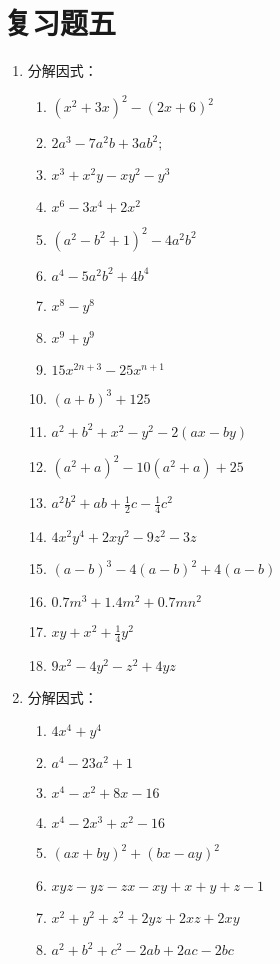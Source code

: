 \section*{复习题五}

\begin{enumerate}
\item 分解因式：
\begin{multicols}{2}
    \begin{enumerate}
    \item $\left(x^{2}+3 x\right)^{2}-(2 x+6)^{2}$
    \item $2 a^{3}-7 a^{2} b+3 a b^{2} ;$
    \item  $x^{3}+x^{2} y-x y^{2}-y^{3}$
    \item  $x^{6}-3 x^{4}+2 x^{2}$
    \item  $\left(a^{2}-b^{2}+1\right)^{2}-4 a^{2} b^{2}$
    \item  $a^{4}-5 a^{2} b^{2}+4 b^{4}$
    \item  $x^{8}-y^{8}$
    \item  $x^{9}+y^{9}$
    \item  $15 x^{2 n+3}-25 x^{n+1}$ 
    \item  $(a+b)^{3}+125$
    \item  $a^{2}+b^{2}+x^{2}-y^{2}-2(a x-b y)$
    \item  $\left(a^{2}+a\right)^{2}-10\left(a^{2}+a\right)+25$
    \item  $a^{2} b^{2}+a b+\frac{1}{2} c-\frac{1}{4} c^{2}$ 
    \item  $4 x^{2} y^{4}+2 x y^{2}-9 z^{2}-3 z$
    \item  $(a-b)^{3}-4(a-b)^{2}+4(a-b)$
    \item  $0.7 m^{3}+1.4 m^{2}+0.7 m n^{2}$ 
    \item  $x y+x^{2}+\frac{1}{4} y^{2}$
    \item  $9 x^{2}-4 y^{2}-z^{2}+4 y z$
\end{enumerate}
\end{multicols}

\item 分解因式：
\begin{multicols}{2}
\begin{enumerate}
    \item $4 x^{4}+y^{4} $
    \item $a^{4}-23 a^{2}+1$
    \item $x^{4}-x^{2}+8 x-16$
    \item $x^{4}-2 x^{3}+x^{2}-16$
    \item $(a x+b y)^{2}+(b x-a y)^{2}$
    \item   $x y z-y z-z x-x y+x+y+z-1$
    \item  $x^{2}+y^{2}+z^{2}+2 y z+2 x z+2 x y$
    \item  $a^{2}+b^{2}+c^{2}-2 a b+2 a c-2 b c$
\end{enumerate}
\end{multicols}


\end{enumerate}
